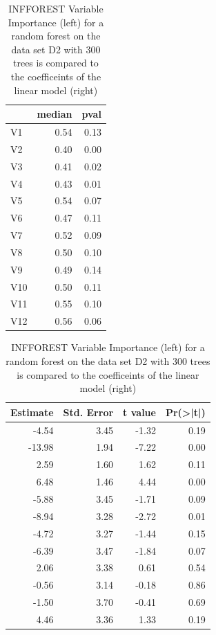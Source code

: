 \documentclass[12pt,twoside]{reedthesis}
\begin{document}
  \begin{table}
  \caption{\label{tab:unnamed-chunk-33}\label{tab:tabntree}INFFOREST Variable Importance (left) for a random forest on the data set D2 with 300 trees is compared to the coefficeints of the linear model (right)}
  
  \centering
  \begin{tabular}[t]{l|r|r}
  \hline
    & median & pval\\
  \hline
  V1 & 0.54 & 0.13\\
  \hline
  V2 & 0.40 & 0.00\\
  \hline
  V3 & 0.41 & 0.02\\
  \hline
  V4 & 0.43 & 0.01\\
  \hline
  V5 & 0.54 & 0.07\\
  \hline
  V6 & 0.47 & 0.11\\
  \hline
  V7 & 0.52 & 0.09\\
  \hline
  V8 & 0.50 & 0.10\\
  \hline
  V9 & 0.49 & 0.14\\
  \hline
  V10 & 0.50 & 0.11\\
  \hline
  V11 & 0.55 & 0.10\\
  \hline
  V12 & 0.56 & 0.06\\
  \hline
  \end{tabular}
  \centering
  \begin{tabular}[t]{r|r|r|r}
  \hline
  Estimate & Std. Error & t value & Pr(>|t|)\\
  \hline
  -4.54 & 3.45 & -1.32 & 0.19\\
  \hline
  -13.98 & 1.94 & -7.22 & 0.00\\
  \hline
  2.59 & 1.60 & 1.62 & 0.11\\
  \hline
  6.48 & 1.46 & 4.44 & 0.00\\
  \hline
  -5.88 & 3.45 & -1.71 & 0.09\\
  \hline
  -8.94 & 3.28 & -2.72 & 0.01\\
  \hline
  -4.72 & 3.27 & -1.44 & 0.15\\
  \hline
  -6.39 & 3.47 & -1.84 & 0.07\\
  \hline
  2.06 & 3.38 & 0.61 & 0.54\\
  \hline
  -0.56 & 3.14 & -0.18 & 0.86\\
  \hline
  -1.50 & 3.70 & -0.41 & 0.69\\
  \hline
  4.46 & 3.36 & 1.33 & 0.19\\
  \hline
  \end{tabular}
  \end{table}
  
\end{document}
